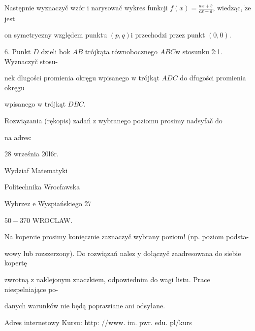 \documentclass[a4paper,12pt]{article}
\begin{document}
Następnie wyznaczyč wzór $\mathrm{i}$ narysowač wykres funkcji $f(x) =\displaystyle \frac{ax+b}{cx+d}$, wiedząc, $\dot{\mathrm{z}}\mathrm{e}$ jest

on symetryczny względem punktu $(p,q)\mathrm{i}$ przechodzi przez punkt $(0,0).$

6. Punkt $D$ dzieli bok $AB$ trójkąta równobocznego $ABC\mathrm{w}$ stosunku 2:1. Wyznaczyč stosu-

nek dlugości promienia okręgu wpisanego $\mathrm{w}$ trójkąt $ADC$ do dfugości promienia okręgu

wpisanego $\mathrm{w}$ trójkąt $DBC.$

Rozwiązania (rękopis) zadań z wybranego poziomu prosimy nadsyfač do

na adres:

28 września 20l6r.

Wydziaf Matematyki

Politechnika Wrocfawska

Wybrzez $\mathrm{e}$ Wyspiańskiego 27

$50-370$ WROCLAW.

Na kopercie prosimy $\underline{\mathrm{k}\mathrm{o}\mathrm{n}\mathrm{i}\mathrm{e}\mathrm{c}\mathrm{z}\mathrm{n}\mathrm{i}\mathrm{e}}$ zaznaczyč wybrany poziom! (np. poziom podsta-

wowy lub rozszerzony). Do rozwiązań nalez $\mathrm{y}$ dołączyč zaadresowana do siebie kopertę

zwrotną $\mathrm{z}$ naklejonym znaczkiem, odpowiednim do wagi listu. Prace niespelniające po-

danych warunków nie będą poprawiane ani odsyłane.

Adres internetowy Kursu: http: //www. im. pwr. edu. pl/kurs
\end{document}
